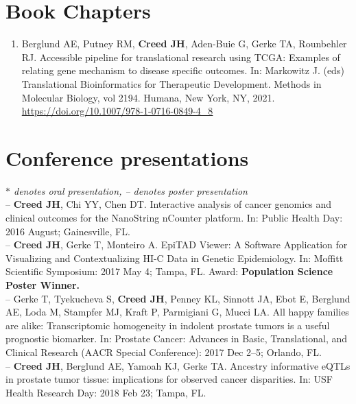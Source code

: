 \documentclass[11pt, a4paper]{article} %
\begin{document}
\section*{Book Chapters}
\begin{enumerate}[leftmargin=*]

\item{} Berglund AE, Putney RM, {\bf Creed JH}, Aden-Buie G, Gerke TA, Rounbehler RJ. Accessible pipeline for translational research using TCGA: Examples of relating gene mechanism to disease specific outcomes. In: Markowitz J. (eds) Translational Bioinformatics for Therapeutic Development. Methods in Molecular Biology, vol 2194. Humana, New York, NY, 2021. \href{https://doi.org/10.1007/978-1-0716-0849-4_8}{https://doi.org/10.1007/978-1-0716-0849-4\_8} \\

\end{enumerate}

\section*{Conference presentations}
\vspace{-.3cm}
{\footnotesize\emph{$*$ denotes oral presentation, -- denotes poster presentation}}\\

-- {\bf Creed JH}, Chi YY, Chen DT. Interactive analysis of cancer genomics and clinical outcomes for the NanoString nCounter platform. In: Public Health Day: 2016 August; Gainesville, FL.\\

-- {\bf Creed JH}, Gerke T, Monteiro A. EpiTAD Viewer: A Software Application for Visualizing and Contextualizing HI-C Data in Genetic Epidemiology. In: Moffitt Scientific Symposium: 2017 May 4; Tampa, FL. Award: {\bf Population Science Poster Winner.}\\

-- Gerke T, Tyekucheva S, {\bf Creed JH}, Penney KL, Sinnott JA, Ebot E, Berglund AE, Loda M, Stampfer MJ, Kraft P, Parmigiani G, Mucci LA. All happy families are alike: Transcriptomic homogeneity in indolent prostate tumors is a useful prognostic biomarker. In: Prostate Cancer: Advances in Basic, Translational, and Clinical Research (AACR Special Conference): 2017 Dec 2--5; Orlando, FL. \\

-- {\bf Creed JH}, Berglund AE, Yamoah KJ, Gerke TA. Ancestry informative eQTLs in prostate tumor tissue: implications for observed cancer disparities. In: USF Health Research Day: 2018 Feb 23; Tampa, FL. \\
\end{document}
